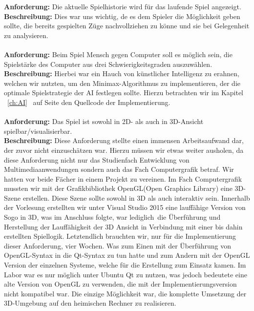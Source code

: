 \documentclass[a4paper]{scrartcl}
\begin{document}
\textbf{Anforderung:} 
Die aktuelle Spielhistorie wird für das laufende Spiel angezeigt.
\\ 
\textbf{Beschreibung:} Dies war uns wichtig, de es dem Spieler die Möglichkeit geben sollte, die bereits gespielten Züge nachvollziehen zu könne und sie bei Gelegenheit zu analysieren.
\\
\\
\textbf{Anforderung:} 
Beim Spiel Mensch gegen Computer soll es möglich sein, die Spielstärke des Computer aus drei Schwierigkeitsgraden auszuwählen.
\\
\textbf{Beschreibung:} Hierbei war ein Hauch von künstlicher Intelligenz zu erahnen, welchen wir nutzten, um den Minimax-Algorithmus zu implementieren, der die optimale Spielstrategie der AI festlegen sollte. Hierzu betrachten wir im Kapitel ~\ref{ch:AI} \glqq{}\grqq \ auf Seite \pageref{ch:AI} den Quellcode der Implementierung.
\\
\\
\textbf{Anforderung:} 
Das Spiel ist sowohl in 2D- als auch in 3D-Ansicht spielbar/visualisierbar.
\\
\textbf{Beschreibung:} Diese Anforderung stellte einen immensen Arbeitsaufwand dar, der zuvor nicht einzuschätzen war. Hierzu müssen wir etwas weiter ausholen, da diese Anforderung nicht nur das Studienfach Entwicklung von Multimediaanwendungen sondern auch das Fach Computergrafik betraf. Wir hatten vor beide Fächer in einem Projekt zu vereinen. Im Fach Computergrafik mussten wir mit der Grafikbibliothek OpenGL(Open Graphics Library) eine 3D-Szene erstellen. Diese Szene sollte sowohl in 3D als auch interaktiv sein. Innerhalb der Vorlesung erstellten wir unter Visual Studio 2015 eine lauffähige Version von Sogo in 3D, was im Anschluss folgte, war \glqq lediglich\grqq \ die Überführung und Herstellung der Lauffähigkeit der 3D Ansicht in Verbindung mit einer bis dahin erstellten Spiellogik. Letztendlich brauchten wir, nur für die  Implementierung dieser Anforderung, vier Wochen. Was zum Einen mit der Überführung von OpenGL-Syntax in die Qt-Syntax zu tun hatte und zum Andern mit der OpenGL Version der einzelnen Systeme, welche für die Erstellung zum Einsatz kamen. Im Labor war es nur möglich unter Ubuntu Qt zu nutzen, was jedoch bedeutete eine alte Version von OpenGL zu verwenden, die mit der Implementierungsversion nicht kompatibel war. Die einzige Möglichkeit war, die komplette Umsetzung der 3D-Umgebung auf den heimischen Rechner zu realisieren.
\\ 
\\
\end{document}
